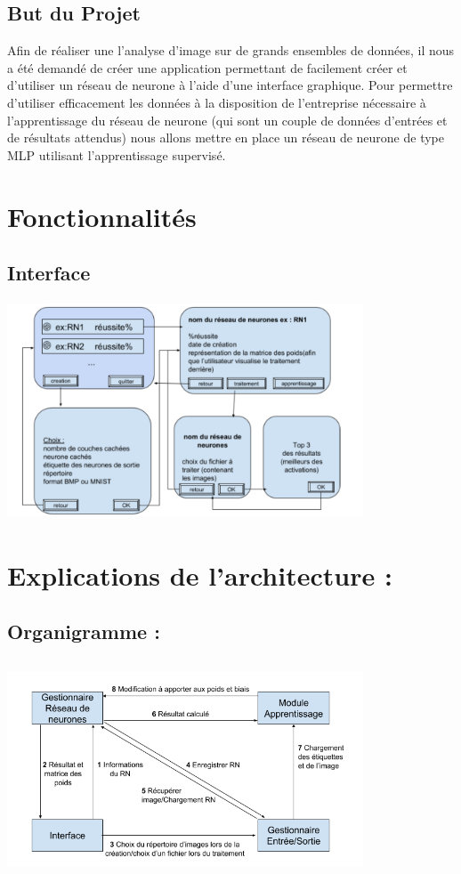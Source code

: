 \documentclass{article}
\begin{document}
	\subsection{But du Projet}
		Afin de réaliser une l'analyse d'image sur de grands ensembles de données, il nous a été demandé de créer une application permettant de facilement créer et d'utiliser un réseau de neurone à l'aide d'une interface graphique. Pour permettre d'utiliser efficacement les données à la disposition de l'entreprise nécessaire à l'apprentissage du réseau de neurone (qui sont un couple de données d'entrées et de résultats attendus) nous allons mettre en place un réseau de neurone de type MLP utilisant l'apprentissage supervisé.

\section{Fonctionnalités}
\subsection{Interface}
			\begin{center} 
				\includegraphics[height=244, width=400]{croquis.PNG}
			\end{center}

\section{Explications de l'architecture :}
\subsection{Organigramme :}
			\begin{center} 
				\includegraphics[height=244, width=400]{liens.PNG}
			\end{center}
\end{document}
